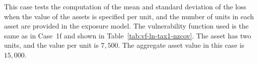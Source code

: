 This case tests the computation of the mean and standard deviation of the loss when the value of the assets is specified per unit, and the number of units in each asset are provided in the exposure model. The vulnerability function used is the same as in Case~1f and shown in Table~\ref{tab:vf-ln-tax1-nzcov}. The asset has two units, and the value per unit is $7,500$. The aggregate asset value in this case is $15,000$.